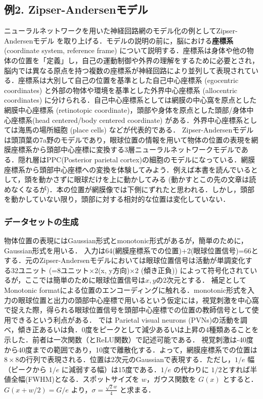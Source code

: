 \subsection{例2. Zipser-Andersenモデル}
ニューラルネットワークを用いた神経回路網のモデル化の例としてZipser-Andersenモデル \citep{Zipser1988-nc} を取り上げる．モデルの説明の前に，脳における\textbf{座標系} (coordinate system, reference frame) について説明する．座標系は身体や他の物体の位置を「定義」し，自己の運動制御や外界の理解をするために必要とされ，脳内では異なる原点を持つ複数の座標系が神経回路により並列して表現されている．座標系は大別して自己の位置を基準とした自己中心座標系 (egocentric coordinates) と外部の物体や環境を基準とした外界中心座標系 (allocentric coordinates) に分けられる．自己中心座標系としては網膜の中心窩を原点とした網膜中心座標系 (retinotopic coordinate)，頭部や身体を原点とした頭部/身体中心座標系(head centered/body centered coordinate) がある．外界中心座標系としては海馬の場所細胞 (place cells) などが代表的である．
Zipser-Andersenモデル \citep{Zipser1988-nc} は頭頂葉の7a野のモデルであり，眼球位置の情報を用いて物体の位置の表現を網膜座標系から頭部中心座標に変換する3層ニューラルネットワークモデルである．隠れ層はPPC(Posterior parietal cortex)の細胞のモデルになっている．網膜座標系から頭部中心座標への変換を体験してみよう．例えば本書を読んでいるとして，頭を動かさずに眼球だけを上に動かしてみる (動かすとこの先の文章は読めなくなるが)．本の位置が網膜像では下側にずれたと思われる．しかし，頭部を動かしていない限り，頭部に対する相対的な位置は変化していない．
\subsubsection{データセットの生成}
物体位置の表現にはGaussian形式とmonotonic形式があるが，簡単のために，Gaussian形式を用いる．
入力は64(網膜座標系での位置)+2(眼球位置信号)=66とする．元のZipser-Andersenモデルにおいては眼球位置信号は活動が単調変化する32ユニット (=8ユニット×2(x, y方向)×2 (傾き正負)) によって符号化されているが，ここでは簡単のために眼球位置信号は$x, y$の2次元とする．
補足としてMonotonic formatによる位置のエンコーディングに触れる．monotonic形式を入力の眼球位置と出力の頭部中心座標で用いるという仮定には，視覚刺激を中心窩で捉えた際，得られる眼球位置信号を頭部中心座標での位置の教師信号として使用できるという利点がある．\citep{Andersen1983-zp} では Parietal visual neurons (PVNs)の活動を調べ，傾き正あるいは負．0度をピークとして減少あるいは上昇の4種類あることを示した．前者は一次関数（とReLU関数）で記述可能である．
視覚刺激は-40度から40度までの範囲であり，10度で離散化する．よって，網膜座標系での位置は$8\times 8$の行列で表現される．位置は2次元のGaussianで表現する．ただし，$1/e$ 幅（ピークから $1/e$ に減弱する幅）は15度である．$1/e$ の代わりに $1/2 $とすれば半値全幅(FWHM)となる．スポットサイズを $w$，ガウス関数を $G(x)$ とすると．$G(x+w/2)=G/e$ より，$\sigma=\frac{\sqrt{2}w}{4}$ と求まる．
